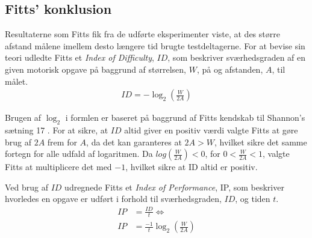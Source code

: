 \subsection*{Fitts' konklusion}
Resultaterne som Fitts fik fra de udførte eksperimenter viste, at des større afstand målene imellem desto længere tid brugte testdeltagerne. For at bevise sin teori udledte Fitts et \textit{Index of Difficulty}, $ID$, som beskriver sværhedsgraden af en given motorisk opgave på baggrund af størrelsen, $W$, på og afstanden, $A$, til målet.
\begin{align*}
ID = -\log_2\left(\frac{W}{2A}\right)
\end{align*}

Brugen af $\log_2$ i formlen er baseret på baggrund af Fitts kendskab til Shannon's sætning 17 \cite{goldberg2015}. For at sikre, at $ID$ altid giver en positiv værdi valgte Fitts at gøre brug af $2A$ frem for $A$, da det kan garanteres at $2A > W$, hvilket sikre det samme fortegn for alle udfald af logaritmen. Da $log\left(\frac{W}{2A}\right)<0$, for $0<\frac{W}{2A}<1$, valgte Fitts at multiplicere det med $-1$, hvilket sikre at ID altid er positiv.

Ved brug af $ID$ udregnede Fitts et \textit{Index of Performance}, IP, som beskriver hvorledes en opgave er udført i forhold til sværhedsgraden, $ID$, og tiden $t$.
\begin{align*}
IP &= \frac{ID}{t}\Leftrightarrow\\
IP &= \frac{-1}{t}\log_2\left(\frac{W}{2A}\right)
\end{align*}


